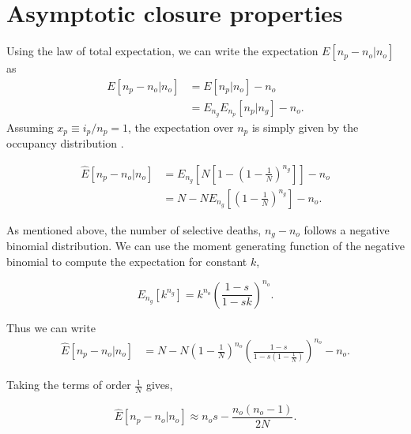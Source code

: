 \documentclass[review]{elsarticle}
\begin{document}
\section{Asymptotic closure properties}
\label{sec:asympt}


Using the law of total expectation, we can write the expectation $E[n_p-n_o | n_o]$ as 
\begin{equation*}
  \begin{aligned}
    \label{eq:lineages-approx}
    E[n_p-n_o | n_o] &=        E[n_p | n_o]       - n_o \\
                     &=E_{n_g} E_{n_p}[n_p | n_g] - n_o.
  \end{aligned}
\end{equation*}
Assuming $x_p\equiv i_p/n_p=1$, the expectation over $n_p$ is simply given by the occupancy distribution \cite{Wakeley2009}.

\begin{equation*}
  \begin{aligned}
    \label{eq:lineages-derive}
    \hat{E}[n_p -n_o | n_o]
    & =   E_{n_g}\left[N\left[1-\left(1 - \frac{1}{N} \right)^{n_g} \right]\right]- n_o\\
    & =   N-N  E_{n_g}\left[\left(1 - \frac{1}{N} \right)^{n_g} \right] -n_o. 
  \end{aligned}
\end{equation*}

As mentioned above, the number of selective deaths, $n_g-n_o$ follows a negative binomial
distribution. We can use the moment generating function of the negative binomial to compute the
expectation for constant $k$,

\begin{equation}
E_{n_g}[k^{n_g}] = k^{n_o}  \left(\frac{1-s}{1-sk}\right)^{n_o}.
\label{eq:identity}
\end{equation} 

Thus we can write 
\begin{align}
  \label{eq:gauss-mean}
  \hat{E}[n_p -n_o | n_o] &= N-N\left( 1 - \frac{1}{N} \right)^{n_o}\left( \frac{1-s}{1-s \left( 1 - \frac{1}{N} \right)}\right)^{n_o}-n_o.
\end{align}

Taking the terms of order $\frac{1}{N}$ gives,

\begin{equation*}
    \label{eq:lineages-approx}
    \hat{E}[n_p-n_o | n_o] \approx n_os - \frac{n_o (n_o-1) }{2N}. 
\end{equation*}
\end{document}
